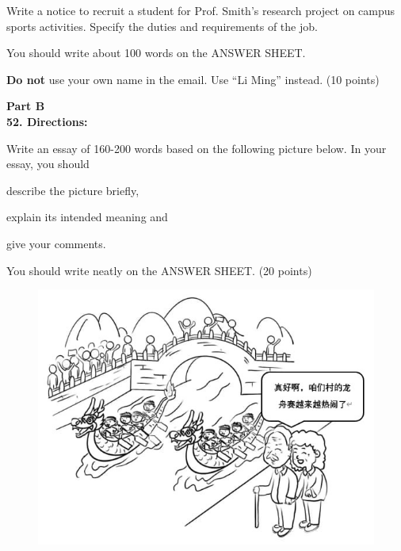 Write a notice to recruit a student for Prof. Smith's research project on campus sports activities. Specify the duties and requirements of the job.

You should write about 100 words on the ANSWER SHEET.

\textbf{Do not} use your own name in the email. Use ``Li Ming'' instead. (10
points)


\vspace{2em}

\noindent
\textbf{Part B}\\
\textbf{52. Directions:}

Write an essay of 160-200 words based on the following picture below. In
your essay, you should
\begin{listwrite}
\item 
 describe the picture briefly,

\item 
 explain its intended meaning and

\item 
 give your comments.
\end{listwrite}

You should write neatly on the ANSWER SHEET. (20 points)

\begin{figure}[h!]
	\centering
	\includegraphics[width=0.55\linewidth]{picture/2023.png}
\end{figure}


